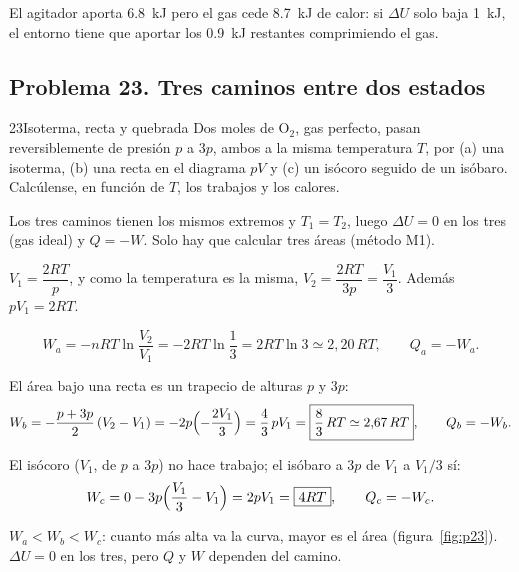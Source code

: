 \begin{observacion}
El agitador aporta \SI{6,8}{kJ} pero el gas cede \SI{8,7}{kJ} de calor: si $\Delta U$ solo baja \SI{1}{kJ}, el entorno
tiene que aportar los \SI{0,9}{kJ} restantes comprimiendo el gas.
\end{observacion}

\subsection{Problema 23. Tres caminos entre dos estados}
\begin{problema}{23}{Isoterma, recta y quebrada}
Dos moles de O$_2$, gas perfecto, pasan reversiblemente de presión $p$ a $3p$, ambos a la misma temperatura
$T$, por (a) una isoterma, (b) una recta en el diagrama $pV$ y (c) un isócoro seguido de un isóbaro.
Calcúlense, en función de $T$, los trabajos y los calores.
\end{problema}

\begin{resolucion}
\idea Los tres caminos tienen los mismos extremos y $T_1=T_2$, luego $\Delta U=0$ en los tres (gas ideal) y
$Q=-W$. Solo hay que calcular tres áreas (método M1).

 $V_1=\dfrac{2RT}{p}$, y como la temperatura es la misma, $V_2=\dfrac{2RT}{3p}=\dfrac{V_1}3$.
Además $pV_1=2RT$.

\[
  W_a=-nRT\ln\frac{V_2}{V_1}=-2RT\ln\frac13=\boxed{2RT\ln3\simeq2{,}20\,RT},\qquad Q_a=-W_a .
\]

 El área bajo una recta es un trapecio de alturas $p$ y $3p$:
\[
  W_b=-\frac{p+3p}{2}\,(V_2-V_1)=-2p\Bigl(-\frac{2V_1}{3}\Bigr)=\frac43\,pV_1=\boxed{\frac83\,RT\simeq2{,}67\,RT},\qquad Q_b=-W_b .
\]

 El isócoro ($V_1$, de $p$ a $3p$) no hace trabajo; el isóbaro a $3p$ de $V_1$ a
$V_1/3$ sí:
\[
  W_c=0-3p\Bigl(\frac{V_1}{3}-V_1\Bigr)=2pV_1=\boxed{4RT},\qquad Q_c=-W_c .
\]

 $W_a<W_b<W_c$: cuanto más alta va la curva, mayor es el área (figura~\ref{fig:p23}).
$\Delta U=0$ en los tres, pero $Q$ y $W$ dependen del camino.
\end{resolucion}

